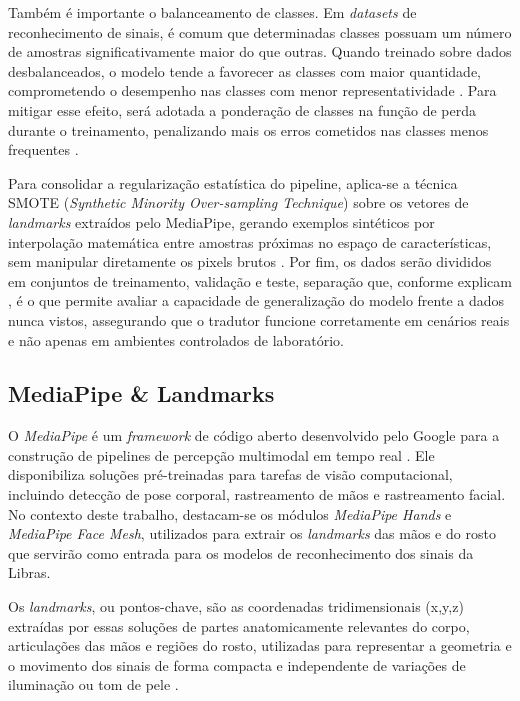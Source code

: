 \documentclass[
    12pt,                %
    openright,           %
    oneside,             %
    a4paper,             %
    english,             %
    brazil               %
]{abntex2}
\begin{document}
Também é importante o balanceamento de classes. Em \textit{datasets} de reconhecimento de sinais, é comum que determinadas classes possuam um número de amostras significativamente maior do que outras. Quando treinado sobre dados desbalanceados, o modelo tende a favorecer as classes com maior quantidade, comprometendo o desempenho nas classes com menor representatividade \cite{Chawla2002}. Para mitigar esse efeito, será adotada a ponderação de classes na função de perda durante o treinamento, penalizando mais os erros cometidos nas classes menos frequentes \cite{Goodfellow2016}.

Para consolidar a regularização estatística do pipeline, aplica-se a técnica SMOTE (\textit{Synthetic Minority Over-sampling Technique}) sobre os vetores de \textit{landmarks} extraídos pelo MediaPipe, gerando exemplos sintéticos por interpolação matemática entre amostras próximas no espaço de características, sem manipular diretamente os pixels brutos \cite{Chawla2002}. Por fim, os dados serão divididos em conjuntos de treinamento, validação e teste, separação que, conforme explicam , é o que permite avaliar a capacidade de generalização do modelo frente a dados nunca vistos, assegurando que o tradutor funcione corretamente em cenários reais e não apenas em ambientes controlados de laboratório.

\subsection{MediaPipe \& Landmarks}

O \textit{MediaPipe} é um \textit{framework} de código aberto desenvolvido pelo Google para a construção de pipelines de percepção multimodal em tempo real \cite{Lugaresi2019}. Ele disponibiliza soluções pré-treinadas para tarefas de visão computacional, incluindo detecção de pose corporal, rastreamento de mãos e rastreamento facial. No contexto deste trabalho, destacam-se os módulos \textit{MediaPipe Hands} e \textit{MediaPipe Face Mesh}, utilizados para extrair os \textit{landmarks} das mãos e do rosto que servirão como entrada para os modelos de reconhecimento dos sinais da Libras.

Os \textit{landmarks}, ou pontos-chave, são as coordenadas tridimensionais (x,y,z) extraídas por essas soluções de partes anatomicamente relevantes do corpo, articulações das mãos e regiões do rosto, utilizadas para representar a geometria e o movimento dos sinais de forma compacta e independente de variações de iluminação ou tom de pele \cite{Zhang2020}.
\end{document}
